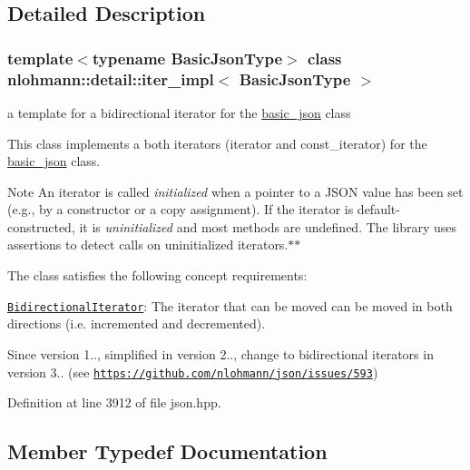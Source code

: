 \subsection{Detailed Description}
\subsubsection*{template$<$typename Basic\+Json\+Type$>$\newline
class nlohmann\+::detail\+::iter\+\_\+impl$<$ Basic\+Json\+Type $>$}

a template for a bidirectional iterator for the \hyperlink{classnlohmann_1_1basic__json}{basic\+\_\+json} class 

This class implements a both iterators (iterator and const\+\_\+iterator) for the \hyperlink{classnlohmann_1_1basic__json}{basic\+\_\+json} class.

\begin{DoxyNote}{Note}
An iterator is called {\itshape initialized} when a pointer to a J\+S\+ON value has been set (e.\+g., by a constructor or a copy assignment). If the iterator is default-\/constructed, it is {\itshape uninitialized} and most methods are undefined. The library uses assertions to detect calls on uninitialized iterators.$\ast$$\ast$
\end{DoxyNote}
The class satisfies the following concept requirements\+:
\begin{DoxyItemize}
\item \href{http://en.cppreference.com/w/cpp/concept/BidirectionalIterator}{\tt Bidirectional\+Iterator}\+: The iterator that can be moved can be moved in both directions (i.\+e. incremented and decremented).
\end{DoxyItemize}

\begin{DoxySince}{Since}
version 1.., simplified in version 2.., change to bidirectional iterators in version 3.. (see \href{https://github.com/nlohmann/json/issues/593}{\tt https\+://github.\+com/nlohmann/json/issues/593}) 
\end{DoxySince}


Definition at line 3912 of file json.\+hpp.



\subsection{Member Typedef Documentation}
\mbox{\label{classnlohmann_1_1detail_1_1iter__impl_aef02cf75b1cb199286fd2f666c60e38e}} 

